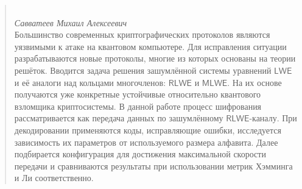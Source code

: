 \begin{abstract}
\begin{center}
    \large{} \\
\large\textit{Савватеев Михаил Алексеевич} \\[1 cm]

Большинство современных криптографических протоколов являются уязвимыми к атаке на квантовом компьютере. Для исправления ситуации разрабатываются новые протоколы, многие из которых основаны на теории решёток. Вводится задача решения зашумлённой системы уравнений $\mathsf{LWE}$ и её аналоги над кольцами многочленов: $\mathsf{RLWE}$ и $\mathsf{MLWE}$. На их основе получаются уже конкретные устойчивые относительно квантового взломщика криптосистемы. В данной работе процесс шифрования рассматривается как передача данных по зашумлённому $\mathsf{RLWE}$-каналу. При декодировании применяются коды, исправляющие ошибки, исследуется зависимость их параметров от используемого размера алфавита. Далее подбирается конфигурация для достижения максимальной скорости передачи и сравниваются результаты при использовании метрик Хэмминга и Ли соответственно.

\end{center}
\end{abstract}
